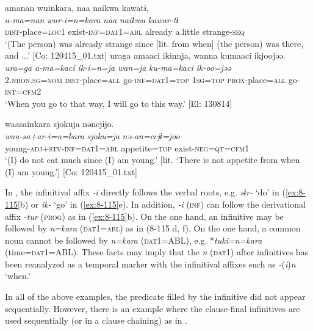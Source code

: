 {\TM}
\glll  amanan  wuinkara,  naa  naikwa  kawatɨ,\\
\textit{a-ma=nan}  \textit{wur-i=n=kara}  \textit{naa}  \textit{naikwa}  \textit{kawar-tɨ}\\
\textsc{dist}-place=\textsc{loc}1  exist-\textsc{inf}=\textsc{dat1}=\textsc{abl}  already  a.little  strange-\textsc{seq}\\
\glt ‘(The person) was already strange since [lit. from when] (the person) was there, and ...’ [Co: 120415\_01.txt]
\ex
{\TM}
\glll  uraga  amaaci  ikinnja,      wanna  kumaaci  ikjoojəə.\\
\textit{ura=ga}  \textit{a-ma=kaci}  \textit{ik-i=n=ja}   \textit{wan=ja}  \textit{ku-ma=kaci}  \textit{ik-oo=jəə}\\
2.\textsc{nhon}.\textsc{sg}=\textsc{nom}  \textsc{dist}-place=\textsc{all}  go-\textsc{inf}=\textsc{dat1}=\textsc{top}  1\textsc{sg}=\textsc{top}  \textsc{prox}-place=\textsc{all}  go-\textsc{int}=\textsc{cfm2}\\
\glt ‘When you go to that way, I will go to this way.’ [El: 130814]

\ex
{\TM}
\glll  waasainkara  {\textbar}sjoku{\textbar}ja  nəncjɨjo.\\
\textit{waa-sa+ar-i=n=kara}  \textit{sjoku=ja}  \textit{nə-an=ccjɨ=joo}\\
young-\textsc{adj}+\textsc{stv}-\textsc{inf}=\textsc{dat1}=\textsc{abl}  appetite=\textsc{top}  exist-\textsc{neg}=\textsc{qt}=\textsc{cfm1}\\
\glt ‘(I) do not eat much since (I) am young.’ [lit. ‘There is not appetite from when (I) am young.’]      [Co: 120415\_01.txt]
\z

In , the infinitival affix \textit{-i} directly follows the verbal roots, e.g. \textit{sɨr-} ‘do’ in (\ref{ex:8-115}b) or \textit{ik-} ‘go’ in (\ref{ex:8-115}e). In addition, \textit{-i} (\textsc{inf}) can follow the derivational affix \textit{-tur} (\textsc{prog}) as in (\ref{ex:8-115}b). On the one hand, an infinitive may be followed by \textit{n=kara} (\textsc{dat1}=\textsc{abl}) as in (8-115 d, f). On the one hand, a common noun cannot be followed by \textit{n=kara} (\textsc{dat1}=ABL), e.g. *\textit{tuki=n=kara} (time=\textsc{dat1}=ABL). These facts may imply that the \textit{n} (\textsc{dat1}) after infinitives has been reanalyzed as a temporal marker with the infinitival affixes such as \textit{-}(\textit{i})\textit{n} ‘when.’

In all of the above examples, the predicate filled by the infinitive did not appear sequentially. However, there is an example where the clause-final infinitives are used sequentially (or in a clause chaining) as in .

